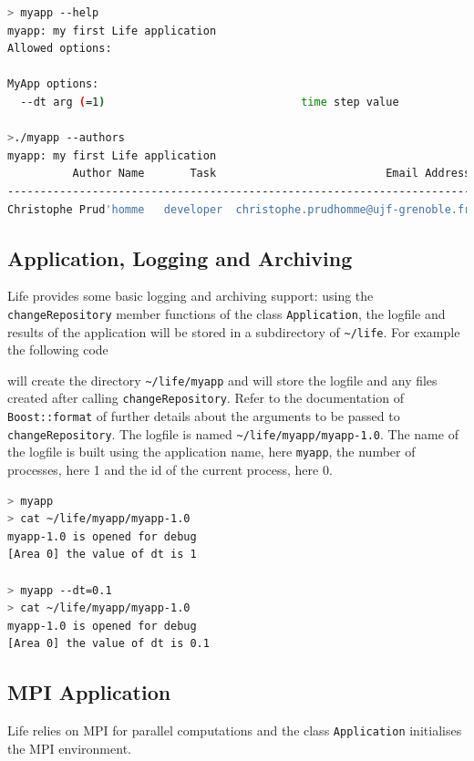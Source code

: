 \documentclass[a4paper]{book}
\newcommand{\life}{Life\xspace}
\begin{document}
\begin{lstlisting}[language=sh]
> myapp --help
myapp: my first Life application
Allowed options:

MyApp options:
  --dt arg (=1)                              time step value

>./myapp --authors
myapp: my first Life application
          Author Name       Task                          Email Address
-----------------------------------------------------------------------
Christophe Prud'homme   developer  christophe.prudhomme@ujf-grenoble.fr
\end{lstlisting}

\subsection{Application, Logging and Archiving}
\label{sec:appl-logg-arch}

\life provides some basic logging and archiving support: using the
\lstinline!changeRepository! member functions of the class
\lstinline!Application!, the logfile and results of the application
will be stored in a subdirectory of \lstinline!~/life!. For
example the following code



will create the directory \lstinline!~/life/myapp! and will store the
logfile and any files created after calling
\lstinline!changeRepository!. Refer to the documentation of
\lstinline!Boost::format! of further details about the arguments to be
passed to \lstinline!changeRepository!. The logfile is named
\lstinline!~/life/myapp/myapp-1.0!. The name of the logfile is built
using the application name, here \lstinline!myapp!, the number of
processes, here 1 and the id of the current process, here 0.

\begin{lstlisting}[language=sh]
> myapp
> cat ~/life/myapp/myapp-1.0
myapp-1.0 is opened for debug
[Area 0] the value of dt is 1

> myapp --dt=0.1
> cat ~/life/myapp/myapp-1.0
myapp-1.0 is opened for debug
[Area 0] the value of dt is 0.1
\end{lstlisting}

\subsection{MPI Application}

\life relies on MPI for parallel computations and the class
\lstinline!Application!  initialises the MPI environment.
\end{document}
